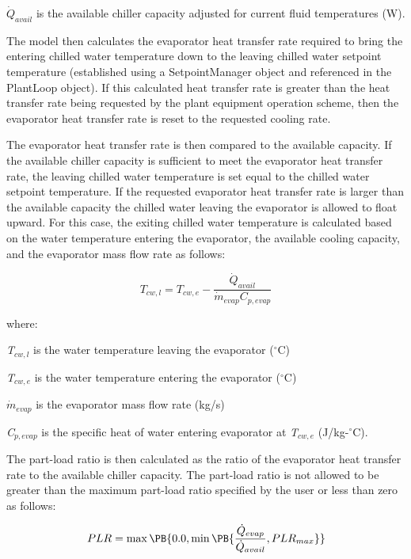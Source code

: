 \(\dot{Q}_{avail}\) is the available chiller capacity adjusted for current fluid temperatures (W).

The model then calculates the evaporator heat transfer rate required to bring the entering chilled water temperature down to the leaving chilled water setpoint temperature (established using a SetpointManager object and referenced in the PlantLoop object). If this calculated heat transfer rate is greater than the heat transfer rate being requested by the plant equipment operation scheme, then the evaporator heat transfer rate is reset to the requested cooling rate.

The evaporator heat transfer rate is then compared to the available capacity. If the available chiller capacity is sufficient to meet the evaporator heat transfer rate, the leaving chilled water temperature is set equal to the chilled water setpoint temperature. If the requested evaporator heat transfer rate is larger than the available capacity the chilled water leaving the evaporator is allowed to float upward. For this case, the exiting chilled water temperature is calculated based on the water temperature entering the evaporator, the available cooling capacity, and the evaporator mass flow rate as follows:

\begin{equation}
  T_{cw,l} = T_{cw,e} - \frac{\dot{Q}_{avail}}{\dot{m}_{evap}C_{p,evap}}
\end{equation}

where:

\emph{T\(_{cw,l}\)} is the water temperature leaving the evaporator (\(^{\circ}\)C)

\emph{T\(_{cw,e}\)} is the water temperature entering the evaporator (\(^{\circ}\)C)

\(\dot{m}_{evap}\) is the evaporator mass flow rate (kg/s)

\emph{C\(_{p,evap}\)} is the specific heat of water entering evaporator at \emph{T\(_{cw,e}\)} (J/kg-\(^{\circ}\)C).

The part-load ratio is then calculated as the ratio of the evaporator heat transfer rate to the available chiller capacity. The part-load ratio is not allowed to be greater than the maximum part-load ratio specified by the user or less than zero as follows:

\begin{equation}
  PLR = \max\PB{0.0,\min\PB{\frac{\dot{Q}_{evap}}{\dot{Q}_{avail}},PLR_{max}}}
\end{equation}

